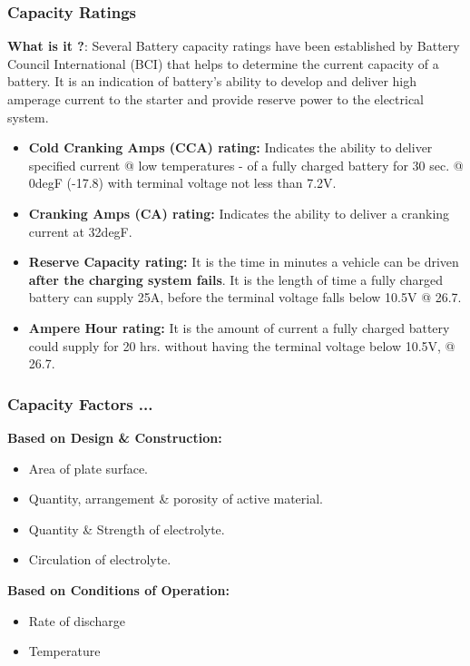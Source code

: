 \documentclass{beamer}
\begin{document}
\begin{frame}     %
  \frametitle{Capacity Ratings}
  \fontsize{8pt}{14}\selectfont
  
  \textbf{What is it ?}: Several Battery capacity ratings have been established by Battery Council International (BCI) that helps to determine the current capacity of a battery.
  It is an indication of battery's ability to develop and deliver high amperage current to the starter and provide reserve power to the electrical system.
  
  \begin{itemize}
    \item \textbf{Cold Cranking Amps (CCA) rating:} Indicates the ability to deliver specified current @ low temperatures - of a fully charged battery 
    for 30 sec. @ 0degF (-17.8\textcelsius) with terminal voltage not less than 7.2V.
    \item \textbf{Cranking Amps (CA) rating:} Indicates the ability to deliver a cranking current at 32degF.
    \item \textbf{Reserve Capacity rating:} It is the time in minutes a vehicle can be driven \textbf{after the charging system fails}. It is the length of time a fully
    charged battery can supply 25A, before the terminal voltage falls below 10.5V @ 26.7\textcelsius.
    \item \textbf{Ampere Hour rating:} It is the amount of current a fully charged battery could supply for 20 hrs. without having the terminal voltage below 10.5V, @ 26.7\textcelsius.
  \end{itemize}
  
\end{frame}

\begin{frame}     %
  \frametitle{Capacity Factors ...}
  \fontsize{9pt}{14}\selectfont
  
  \textbf{Based on Design \& Construction:}
  \begin{itemize}
    \item Area of plate surface.
    \item Quantity, arrangement \& porosity of active material.
    \item Quantity \& Strength of electrolyte.
    \item Circulation of electrolyte.
  \end{itemize}

  \bigskip
  \textbf{Based on Conditions of Operation:}
  \begin{itemize}
    \item Rate of discharge
    \item Temperature
  \end{itemize}  
\end{frame}
\end{document}
